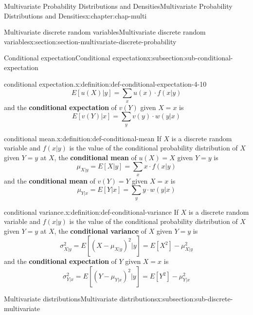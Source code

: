 \documentclass[oneside,10pt,]{book}
\newcommand{\terminology}[1]{\textbf{#1}}
\numberwithin{equation}{section}
\begin{document}
\begin{chapterptx}{Multivariate Probability Distributions and Densities}{}{Multivariate Probability Distributions and Densities}{}{}{x:chapter:chap-multi}
\begin{sectionptx}{Multivariate discrete random variables}{}{Multivariate discrete random variables}{}{}{x:section:section-multivariate-discrete-probability}
\begin{subsectionptx}{Conditional expectation}{}{Conditional expectation}{}{}{x:subsection:sub-conditional-expectation}
\begin{definition}{conditional expectation.}{x:definition:def-conditional-expectation-4-10}
\begin{equation*}
E[u(X)|y] = \sum_x u(x)\cdot f(x|y)
\end{equation*}
and the \terminology{conditional expectation} of \(\displaystyle v(Y)\) given \(\displaystyle X
= x\) is%
\begin{equation*}
E[v(Y)|x] = \sum_y v(y)\cdot w(y|x)
\end{equation*}
%
\end{definition}
\begin{definition}{conditional mean.}{x:definition:def-conditional-mean}%
If \(X\) is a discrete random variable and \(\displaystyle f(x|y)\) is the value of the conditional probability distribution of \(X\) given \(\displaystyle Y = y\) at \(X\), the \terminology{conditional mean} of \(\displaystyle u(X) = X\) given \(\displaystyle Y = y\) is%
\begin{equation*}
\mu_{X|y} = E[X|y] = \sum_x x\cdot f(x|y)
\end{equation*}
and the \terminology{conditional mean} of \(\displaystyle v(Y) = Y\) given \(\displaystyle X = x\) is%
\begin{equation*}
\displaystyle \mu_{Y|x} = E[Y|x] = \sum_y y\cdot w(y|x)
\end{equation*}
%
\end{definition}
\begin{definition}{conditional variance.}{x:definition:def-conditional-variance}%
If \(X\) is a discrete random variable and \(\displaystyle f(x|y)\) is the value of the conditional probability distribution of \(X\) given \(\displaystyle Y = y\) at \(X\), the \terminology{conditional variance} of \(X\) given \(\displaystyle Y = y\) is%
\begin{equation*}
\sigma^2_{X|y} = E[(X-\mu_{X|y})^2|y] = E[X^2]-\mu^2_{X|y}
\end{equation*}
and the \terminology{conditional expectation} of \(Y\) given \(\displaystyle X = x\) is%
\begin{equation*}
\displaystyle\sigma^2_{Y|x} = E[(Y-\mu_{Y|x})^2|y] =
E[Y^2]-\mu^2_{Y|x}
\end{equation*}
%
\end{definition}
\end{subsectionptx}
%
%
\typeout{************************************************}
\typeout{************************************************}
%
\begin{subsectionptx}{Multivariate distributions}{}{Multivariate distributions}{}{}{x:subsection:sub-discrete-multivariate}

\end{subsectionptx}
\end{sectionptx}
\end{chapterptx}
\end{document}
